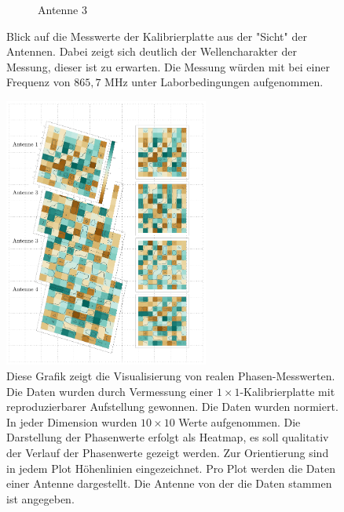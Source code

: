 \begin{figure}[h!]
\begin{subfigure}[b]{0.4\textwidth}
			\caption[Loren ipsum]{Antenne 3}
			\label{fig:Plate0_A4}
        \end{subfigure}
        \caption[Reale Messwerte visualisiert]{Blick auf die Messwerte der  Kalibrierplatte aus der "Sicht" der Antennen. Dabei zeigt sich deutlich der Wellencharakter der Messung, dieser ist zu erwarten. Die Messung würden mit bei einer Frequenz von $865,7$ MHz unter Laborbedingungen aufgenommen. }\label{fig:Real_Measurements}
\end{figure}
%
\begin{figure}[ht!]
         \centering
         \includegraphics[width=0.6\textwidth]{img/complexitiy1.pdf}
         \caption[Normierte Messwerte von Kalibriermessung]{Diese Grafik zeigt die Visualisierung von realen Phasen-Messwerten. Die Daten wurden durch Vermessung einer $1\times1$-Kalibrierplatte mit reproduzierbarer Aufstellung gewonnen. Die Daten wurden normiert. In jeder Dimension wurden $10\times10$ Werte aufgenommen. Die Darstellung der Phasenwerte erfolgt als Heatmap, es soll qualitativ der Verlauf der Phasenwerte gezeigt werden. Zur Orientierung sind in jedem Plot Höhenlinien eingezeichnet. Pro Plot werden die Daten einer Antenne dargestellt. Die Antenne von der die Daten stammen ist angegeben.}
         \label{fig:Complexity1}
%
\end{figure}

